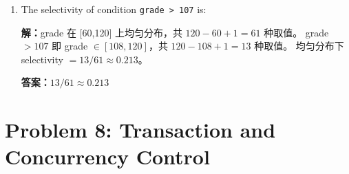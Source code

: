 \documentclass[11pt,a4paper]{article}
\newcommand{\solution}{\par\noindent\textcolor{ansblue}{\textbf{解：}}}
\newcommand{\answer}{\par\noindent\textcolor{ansred}{\textbf{答案：}}}
\begin{document}
\begin{enumerate}[leftmargin=*,itemsep=6pt]
  \solution $\texttt{sid}$ 有 50 个 distinct 值。等值连接 $s.sid = g.sid$ 的
  selectivity $= 1 / \max(V(s.sid, student), V(sid, grade))
  = 1 / \max(50, 50) = 1/50$。

  含义：在笛卡尔积中，仅 1/50 的行连接条件成立。

  \answer \textcolor{ansred}{$1/50 = 0.02$}

\item The selectivity of condition \texttt{grade > 107} is:
  \underline{\hspace{2cm}}

  \solution grade 在 [60,120] 上均匀分布，共 $120-60+1 = 61$ 种取值。
  grade $> 107$ 即 grade $\in [108, 120]$，共 $120-108+1 = 13$ 种取值。
  均匀分布下 selectivity $= 13/61 \approx 0.213$。

  \answer \textcolor{ansred}{$13/61 \approx 0.213$}

\end{enumerate}

\section*{Problem 8: Transaction and Concurrency Control}
\end{document}
